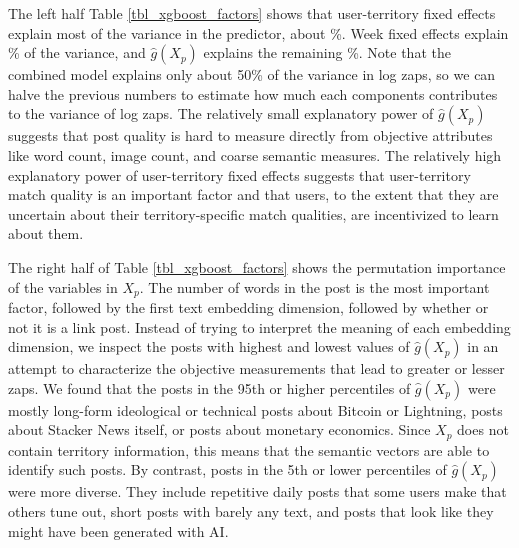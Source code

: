 The left half Table \ref{tbl_xgboost_factors} shows that user-territory fixed effects explain most of the variance in the predictor, about \%. Week fixed effects explain \% of the variance, and $\hat{g}(X_p)$ explains the remaining \%. Note that the combined model explains only about 50\% of the variance in log zaps, so we can halve the previous numbers to estimate how much each components contributes to the variance of log zaps. The relatively small explanatory power of $\hat{g}(X_p)$ suggests that post quality is hard to measure directly from objective attributes like word count, image count, and coarse semantic measures. The relatively high explanatory power of user-territory fixed effects suggests that user-territory match quality is an important factor and that users, to the extent that they are uncertain about their territory-specific match qualities, are incentivized to learn about them.

The right half of Table \ref{tbl_xgboost_factors} shows the permutation importance of the variables in $X_p$. The number of words in the post is the most important factor, followed by the first text embedding dimension, followed by whether or not it is a link post. Instead of trying to interpret the meaning of each embedding dimension, we inspect the posts with highest and lowest values of $\hat{g}(X_p)$ in an attempt to characterize the objective measurements that lead to greater or lesser zaps. We found that the posts in the 95th or higher percentiles of $\hat{g}(X_p)$ were mostly long-form ideological or technical posts about Bitcoin or Lightning, posts about Stacker News itself, or posts about monetary economics. Since $X_p$ does not contain territory information, this means that the semantic vectors are able to identify such posts. By contrast, posts in the 5th or lower percentiles of $\hat{g}(X_p)$ were more diverse. They include repetitive daily posts that some users make that others tune out, short posts with barely any text, and posts that look like they might have been generated with AI. 


